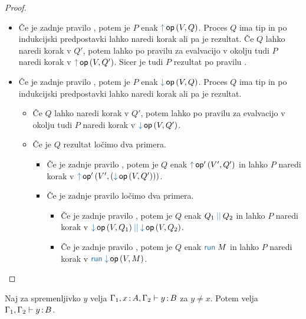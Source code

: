 \begin{proof}
\begin{itemize}
		\item Če je zadnje pravilo , potem je $P$ enak $\tmopout{op}{V}{Q}$. Proces $Q$ ima tip in po indukcijski predpostavki lahko naredi korak ali pa je rezultat.
		Če $Q$ lahko naredi korak v $Q'$, potem lahko po pravilu za evalvacijo v okolju tudi $P$ naredi korak v $\tmopout{op}{V}{Q'}$.
		Sicer je tudi $P$ rezultat po pravilu .
		
		\item Če je zadnje pravilo , potem je $P$ enak $\tmopin{op}{V}{Q}$. Proces $Q$ ima tip in po indukcijski predpostavki lahko naredi korak ali pa je rezultat.
		\begin{itemize}
			\item Če $Q$ lahko naredi korak v $Q'$, potem lahko po pravilu za evalvacijo v okolju tudi $P$ naredi korak v $\tmopin{op}{V}{Q'}$.
			\item Če je $Q$ rezultat ločimo dva primera.
			\begin{itemize}
				
				\item Če je zadnje pravilo , potem je $Q$ enak $\tmopout{op'}{V'}{Q'}$ in lahko $P$ naredi korak v $\tmopout{op'}{V'}{(\tmopin{op}{V}{Q'})}$.
				
				\item Če je zadnje pravilo  ločimo dva primera.
				\begin{itemize}
					\item Če je zadnje pravilo , potem je $Q$ enak $\tmpar{Q_1}{Q_2}$ in lahko $P$ naredi korak v $\tmpar{\tmopin{op}{V}{Q_1}}{\tmopin{op}{V}{Q_2}}$.
					\item Če je zadnje pravilo , potem je $Q$ enak $\tmrun{M}$ in lahko $P$ naredi korak v $\tmrun{\tmopin{op}{V}{M}}$.
				\end{itemize}
				
			\end{itemize}
		
		\end{itemize}
		
	\end{itemize}
		
\end{proof}


\begin{lema}\label{lem:strengthening-gamma}
	Naj za spremenljivko $y$ velja $\Gamma_1, x \mathinner{:} A, \Gamma_2 \vdash y \mathinner{:} B$ za $y \neq x$. Potem velja $\Gamma_1, \Gamma_2 \vdash y \mathinner{:} B$.
\end{lema}


